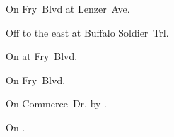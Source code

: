 
\begin{LocationList}

On Fry~Blvd at Lenzer~Ave.

Off  to the east at Buffalo Soldier~Trl.

On  at Fry~Blvd.

\Location{\RecruitmentAgency \Recruitment}
On Fry~Blvd.

\Location{\TruckStop \Gas \Rest}
On Commerce~Dr, by  .

On .

\end{LocationList}
